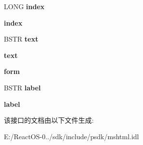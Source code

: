 \begin{DoxyCompactItemize}
L\+O\+NG {\bfseries index}
\item 
\mbox{\label{interface_m_s_h_t_m_l_1_1_disp_h_t_m_l_option_element_a88109a00cd20f9134b25a1a9de64484f}} 
{\bfseries index}
\item 
\mbox{\label{interface_m_s_h_t_m_l_1_1_disp_h_t_m_l_option_element_ae2b6efcbaf4b59891da6eb0a28bfcdd7}} 
B\+S\+TR {\bfseries text}
\item 
\mbox{\label{interface_m_s_h_t_m_l_1_1_disp_h_t_m_l_option_element_a71f0d3352401c8889dd3712c4f5c92bb}} 
{\bfseries text}
\item 
\mbox{\label{interface_m_s_h_t_m_l_1_1_disp_h_t_m_l_option_element_a53c9b1eeda3e13fa0c206e7b699740f4}} 
{\bfseries form}
\item 
\mbox{\label{interface_m_s_h_t_m_l_1_1_disp_h_t_m_l_option_element_a4ed5b6fa45caececca64aa5765b149c8}} 
B\+S\+TR {\bfseries label}
\item 
\mbox{\label{interface_m_s_h_t_m_l_1_1_disp_h_t_m_l_option_element_afd88beeb0d04005d63ce4ab7145e2b4b}} 
{\bfseries label}
\end{DoxyCompactItemize}


该接口的文档由以下文件生成\+:\begin{DoxyCompactItemize}
\item 
E\+:/\+React\+O\+S-\/0../sdk/include/psdk/mshtml.\+idl\end{DoxyCompactItemize}
